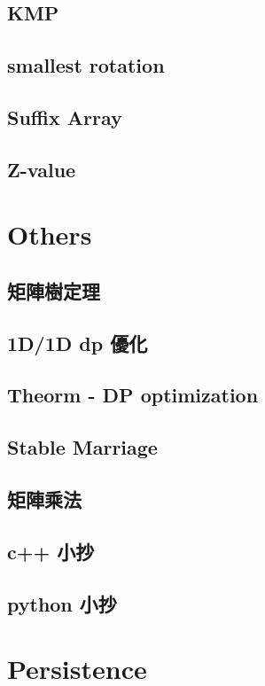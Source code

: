 \subsection{KMP}

\subsection{smallest rotation}

\subsection{Suffix Array}

\subsection{Z-value}


\section{Others}

\subsection{矩陣樹定理}

\subsection{1D/1D dp 優化}

\subsection{Theorm - DP optimization}

\subsection{Stable Marriage}

\subsection{矩陣乘法}

\subsection{c++ 小抄}

\subsection{python 小抄}



\section{Persistence}

